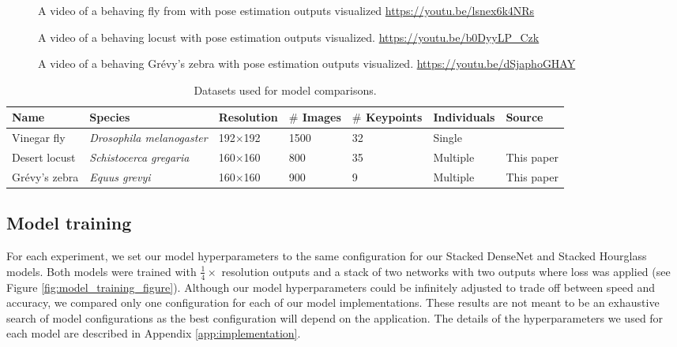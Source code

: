 \documentclass[11pt,a4paper,twoside]{book}
\begin{document}
\begin{doublespace}
\begin{figure}[!htb]
\end{figure}
\begin{figure}[!htb]
    \centering
    \caption{A video of a behaving fly from \cite{pereira2019fast} with pose estimation outputs visualized \url{https://youtu.be/lsnex6k4NRs}}
    \label{videosupp:sv1}
\end{figure}

\begin{figure}[!htb]
    \centering
    \caption{A video of a behaving locust with pose estimation outputs visualized. \url{https://youtu.be/b0DyyLP_Czk}}
    \label{videosupp:sv2}
\end{figure}

\begin{figure}[!htb]
    \centering
    \caption{A video of a behaving Grévy's zebra with pose estimation outputs visualized. \url{https://youtu.be/dSjaphoGHAY}}
    \label{videosupp:sv3}
\end{figure}


\begin{table}[!htb]

\caption{\label{tab:datasets}Datasets used for model comparisons.}
\setlength{\tabcolsep}{2pt}
\centering
\begin{tabular}{|m{}|m{}|m{}|m{}|m{}|m{}|m{}|}
\hline
{Name} & Species   & {Resolution}  & {$\#$ Images}  & {$\#$ Keypoints} & {Individuals} & Source    \\ \hline
Vinegar fly  & \textit{Drosophila melanogaster} & {192$\times$192} & 1500 & 32 & Single & \cite{pereira2019fast} \\ \hline
Desert locust     & \textit{Schistocerca gregaria}       & 160$\times$160           & 800    & 35 & Multiple  & This paper\\ \hline
Grévy's zebra      & \textit{Equus grevyi}      & 160$\times$160              & 900    & 9 & Multiple & This paper \\ \hline
\end{tabular}

\end{table}

\subsection{Model training}
For each experiment, we set our model hyperparameters to the same configuration for our Stacked DenseNet and Stacked Hourglass models. Both models were trained with $\tfrac{1}{4}\times$ resolution outputs and a stack of two networks with two outputs where loss was applied (see Figure \ref{fig:model_training_figure}). Although our model hyperparameters could be infinitely adjusted to trade off between speed and accuracy, we compared only one configuration for each of our model implementations. These results are not meant to be an exhaustive search of model configurations as the best configuration will depend on the application. The details of the hyperparameters we used for each model are described in Appendix \ref{app:implementation}.


\end{doublespace}
\end{document}
